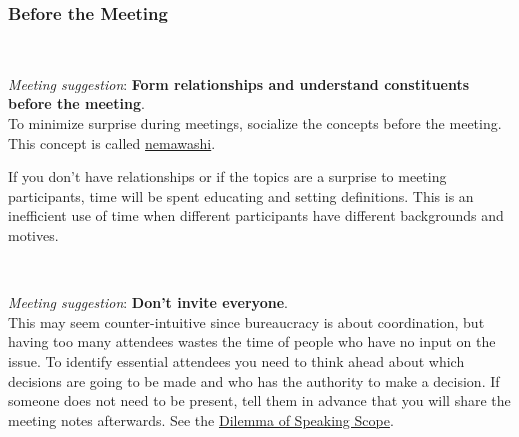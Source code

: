 
\subsubsection*{Before the Meeting}

\ \\
\begin{samepage}
\textit{Meeting suggestion}: \textbf{Form relationships and understand constituents before the meeting}.\\
To minimize surprise during meetings, socialize the concepts before the meeting. This concept is called 
\href{https://en.wikipedia.org/wiki/Nemawashi}{nemawashi}.
\iftoggle{WPinmargin}{\marginpar{$>$Wikipedia: Nemawashi}}{}
\end{samepage}

If you don't have relationships or if the topics are a surprise to meeting participants, time will be spent educating and setting definitions. This is an inefficient use of time when different participants have different backgrounds and motives.

\ \\
\begin{samepage}
\textit{Meeting suggestion}: \textbf{Don't invite everyone}.\\
This may seem counter-intuitive since bureaucracy is about coordination, but having too many attendees wastes the time of people who have no input on the issue. 
To identify essential attendees you need to think ahead about which decisions are going to be made and who has the authority to make a decision. If someone does not need to be present, tell them in advance that you will share the meeting notes afterwards. See the \hyperref[table:dilemma-personal-scope-of-speaking]{Dilemma of Speaking Scope}.
\end{samepage}

